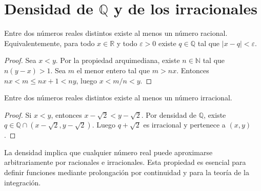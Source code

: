 \section{Densidad de \texorpdfstring{$\mathbb{Q}$}{Q} y de los irracionales}

\begin{theorem}
\label{teo:densidad-q}
Entre dos números reales distintos existe al menos un número racional. Equivalentemente, para todo $x\in\mathbb{R}$ y todo $\varepsilon>0$ existe $q\in\mathbb{Q}$ tal que $|x-q|<\varepsilon$.
\end{theorem}

\begin{proof}
Sea $x<y$. Por la propiedad arquimediana, existe $n\in\mathbb{N}$ tal que $n(y-x)>1$. Sea $m$ el menor entero tal que $m>nx$. Entonces $nx<m\leq nx+1<ny$, luego $x<m/n<y$.
\end{proof}

\begin{center}
\end{center}

\begin{corollary}
\label{cor:densidad-irracionales}
Entre dos números reales distintos existe al menos un número irracional.
\end{corollary}
\begin{proof}
Si $x<y$, entonces $x-\sqrt{2}<y-\sqrt{2}$. Por densidad de $\mathbb{Q}$, existe $q\in\mathbb{Q}\cap(x-\sqrt{2},y-\sqrt{2})$. Luego $q+\sqrt{2}$ es irracional y pertenece a $(x,y)$.
\end{proof}

\begin{remark}
La densidad implica que cualquier número real puede aproximarse arbitrariamente por racionales e irracionales. Esta propiedad es esencial para definir funciones mediante prolongación por continuidad y para la teoría de la integración.
\end{remark}

